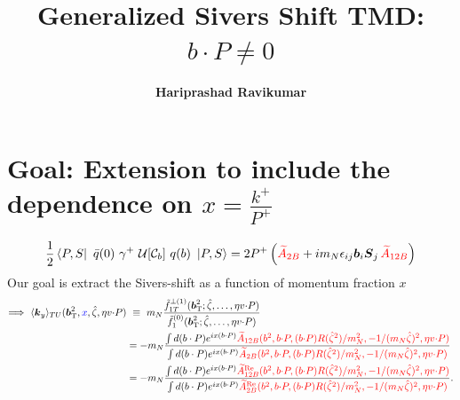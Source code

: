 \documentclass[]{article}
\title{Generalized Sivers Shift TMD: $b\cdot P \neq 0$}
\author{\textbf{Hariprashad Ravikumar}}
\date{}
\numberwithin{equation}{section}
\newcommand{\tcdot}{{\cdot}}
\newcommand{\WlineC}[1]{\ensuremath{{\mathcal{U}}{[#1]}}}
\newcommand{\vect}[1]{\ensuremath{\boldsymbol{#1}}}
\newcommand{\vprp}[1]{\vect{#1}_{\mathrm T}}
\newcommand{\tAmp}{\widetilde{A}}
\newcommand{\bvec}{b}
\newcommand{\mN}{m_N}
\newcommand{\zetahat}{{\hat \zeta}}
\begin{document}
	\maketitle
\tableofcontents
\section{Goal: Extension to include the dependence on $x=\frac{k^{+}}{P^{+}}$}
\begin{align}
    \frac{1}{2} \bra{P,S}\ \bar{q}(0)\ \gamma^{+}\ \WlineC{\mathcal{C}_\bvec}\ q(\bvec)\ \ket{P,S}=2P^{+}\left(\textcolor{red}{\tAmp_{2B} }
		+ i \mN \epsilon_{ij} \vect{\bvec}_i \vect{S}_j\, \textcolor{red}{\tAmp_{12B} }\right)
\end{align}
Our goal is extract the Sivers-shift as a function of momentum fraction $x$
\begin{align}
   \Longrightarrow~ \langle \vect{k}_y \rangle_{TU}(\vprp{\bvec}^2,\textcolor{blue}{x},\zetahat,\eta v \tcdot P) 
	&\ \equiv\ \mN \frac{\tilde f_{1T}^{\perp(1)}(\vprp{\bvec}^2;\zetahat,\ldots,\eta v \tcdot P)}{\tilde f_1^{(0)}(\vprp{\bvec}^2;\zetahat,\ldots,\eta v \tcdot P)}\\
 &=-m_{N} \frac{\int d(b\cdot P)e^{ix(b\cdot P)} \textcolor{red}{\tAmp_{12B}(\bvec^2,\bvec \tcdot P,(\bvec \tcdot P) R(\zetahat^2)/\mN^2,-1/(\mN\zetahat)^2,\eta v \tcdot P)}}{\int d(b\cdot P)e^{ix(b\cdot P)}\textcolor{red}{\tAmp_{2B}(\bvec^2,\bvec \tcdot P,(\bvec \tcdot P) R(\zetahat^2)/\mN^2,-1/(\mN\zetahat)^2,\eta v \tcdot P)}}\\
 &=-m_{N} \frac{\int d(b\cdot P)e^{ix(b\cdot P)} \textcolor{red}{\tAmp_{12B}^{\text{Re}}(\bvec^2,\bvec \tcdot P,(\bvec \tcdot P) R(\zetahat^2)/\mN^2,-1/(\mN\zetahat)^2,\eta v \tcdot P)}}{\int d(b\cdot P)e^{ix(b\cdot P)}\textcolor{red}{\tAmp_{2B}^{\text{Re}}(\bvec^2,\bvec \tcdot P,(\bvec \tcdot P) R(\zetahat^2)/\mN^2,-1/(\mN\zetahat)^2,\eta v \tcdot P)}}.
 \end{align}
\end{document}
